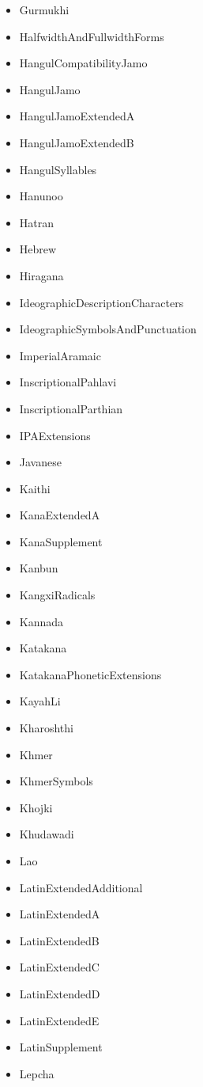 \documentclass{article}
\newenvironment{itemlist}{%
  \begin{itemize}
	\setlength{\itemsep}{0pt}
	\setlength{\parsep}{0pt}
	\setlength{\topsep}{0pt}
	\setlength{\partopsep}{0pt}
	\setlength{\parskip}{0pt}
	\setlength{\labelsep}{5pt}}%
{
  \end{itemize}}
\begin{document}
\begin{multicols*}{2}
\begin{itemlist}
				\item Gurmukhi
				\item HalfwidthAndFullwidthForms
				\item HangulCompatibilityJamo
				\item HangulJamo
				\item HangulJamoExtendedA
				\item HangulJamoExtendedB
				\item HangulSyllables
				\item Hanunoo
				\item Hatran
				\item Hebrew
				\item Hiragana
				\item IdeographicDescriptionCharacters
				\item IdeographicSymbolsAndPunctuation
				\item ImperialAramaic
				\item InscriptionalPahlavi
				\item InscriptionalParthian
				\item IPAExtensions
				\item Javanese
				\item Kaithi
				\item KanaExtendedA
				\item KanaSupplement
				\item Kanbun
				\item KangxiRadicals
				\item Kannada
				\item Katakana
				\item KatakanaPhoneticExtensions
				\item KayahLi
				\item Kharoshthi
				\item Khmer
				\item KhmerSymbols
				\item Khojki
				\item Khudawadi
				\item Lao
				\item LatinExtendedAdditional
				\item LatinExtendedA
				\item LatinExtendedB
				\item LatinExtendedC
				\item LatinExtendedD
				\item LatinExtendedE
				\item LatinSupplement
				\item Lepcha

\end{itemlist}
\end{multicols*}
\end{document}

